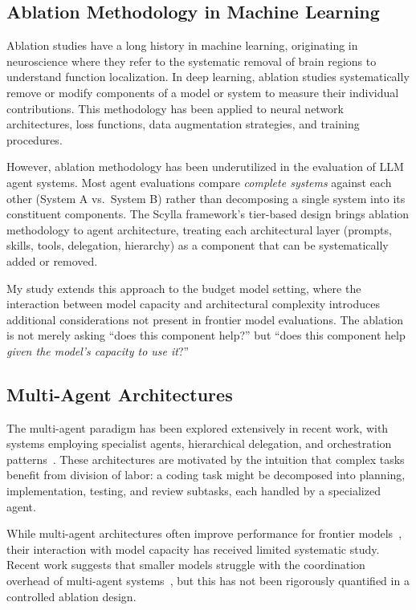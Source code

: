 \documentclass[11pt]{article}
\begin{document}
\subsection{Ablation Methodology in Machine Learning}
\label{sec:ablation_method}

Ablation studies have a long history in machine learning, originating in
neuroscience where they refer to the systematic removal of brain regions to
understand function localization. In deep learning, ablation studies
systematically remove or modify components of a model or system to measure
their individual contributions. This methodology has been applied to neural
network architectures, loss functions, data augmentation strategies, and
training procedures.

However, ablation methodology has been underutilized in the evaluation of
LLM agent systems. Most agent evaluations compare \emph{complete systems}
against each other (System A vs.\ System B) rather than decomposing a single
system into its constituent components. The Scylla framework's tier-based
design brings ablation methodology to agent architecture, treating each
architectural layer (prompts, skills, tools, delegation, hierarchy) as a
component that can be systematically added or removed.

My study extends this approach to the budget model setting, where the
interaction between model capacity and architectural complexity introduces
additional considerations not present in frontier model evaluations. The
ablation is not merely asking ``does this component help?'' but ``does this
component help \emph{given the model's capacity to use it}?''

\subsection{Multi-Agent Architectures}
\label{sec:multi_agent}

The multi-agent paradigm has been explored extensively in recent work, with
systems employing specialist agents, hierarchical delegation, and
orchestration patterns~\cite{anthropic2024claude}. These architectures are
motivated by the intuition that complex tasks benefit from division of labor:
a coding task might be decomposed into planning, implementation, testing, and
review subtasks, each handled by a specialized agent.

While multi-agent architectures often improve performance for frontier
models~\cite{guo2024llmmultiagents}, their interaction with model capacity has
received limited systematic study. Recent work suggests that smaller models
struggle with the coordination overhead of multi-agent
systems~\cite{dervishi2025multiagent}, but this has not been rigorously
quantified in a controlled ablation design.
\end{document}
